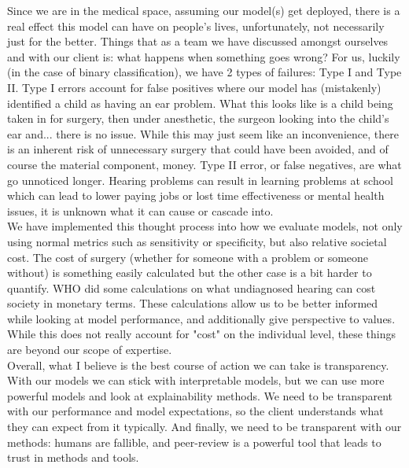 \documentclass[a4paper]{article}
\begin{document}
Since we are in the medical space, assuming our model(s) get deployed, there is a real effect this model can have on people’s lives, unfortunately, not necessarily just for the better. Things that as a team we have discussed amongst ourselves and with our client is: what happens when something goes wrong? For us, luckily (in the case of binary classification), we have 2 types of failures: Type I and Type II. Type I errors account for false positives where our model has (mistakenly) identified a child as having an ear problem. What this looks like is a child being taken in for surgery, then under anesthetic, the surgeon looking into the child's ear and... there is no issue. While this may just seem like an inconvenience, there is an inherent risk of unnecessary surgery that could have been avoided, and of course the material component, money. Type II error, or false negatives, are what go unnoticed longer. Hearing problems can result in learning problems at school which can lead to lower paying jobs or lost time effectiveness or mental health issues, it is unknown what it can cause or cascade into. \\

We have implemented this thought process into how we evaluate models, not only using normal metrics such as sensitivity or specificity, but also relative societal cost. The cost of surgery (whether for someone with a problem or someone without) is something easily calculated but the other case is a bit harder to quantify. WHO did some calculations on what undiagnosed hearing can cost society in monetary terms. These calculations allow us to be better informed while looking at model performance, and additionally give perspective to values. While this does not really account for "cost" on the individual level, these things are beyond our scope of expertise.  \\

Overall, what I believe is the best course of action we can take is transparency. With our models we can stick with interpretable models, but we can use more powerful models and look at explainability methods. We need to be transparent with our performance and model expectations, so the client understands what they can expect from it typically. And finally, we need to be transparent with our methods: humans are fallible, and peer-review is a powerful tool that leads to trust in methods and tools.

\pagebreak
\nocite{*}


\end{document}
